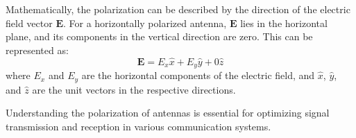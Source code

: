Mathematically, the polarization can be described by the direction of the electric field vector \(\mathbf{E}\). For a horizontally polarized antenna, \(\mathbf{E}\) lies in the horizontal plane, and its components in the vertical direction are zero. This can be represented as:
\[
\mathbf{E} = E_x \hat{x} + E_y \hat{y} + 0 \hat{z}
\]
where \(E_x\) and \(E_y\) are the horizontal components of the electric field, and \(\hat{x}\), \(\hat{y}\), and \(\hat{z}\) are the unit vectors in the respective directions.

Understanding the polarization of antennas is essential for optimizing signal transmission and reception in various communication systems.

